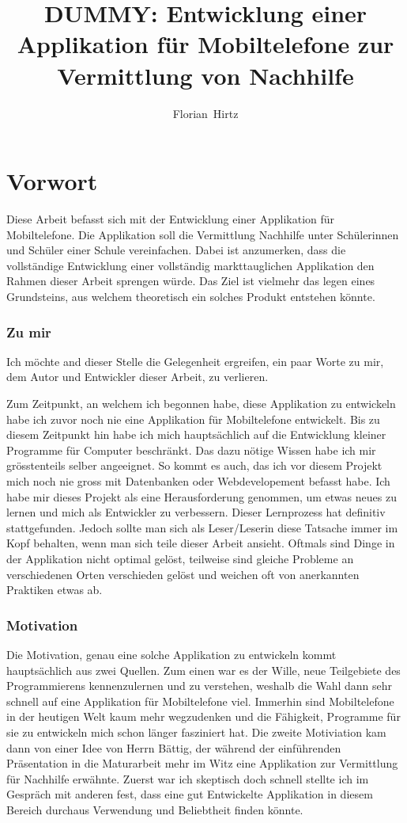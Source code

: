 \documentclass[a4paper,11pt]{report}
\author{Florian~Hirtz}
\title{DUMMY: Entwicklung einer Applikation für Mobiltelefone zur Vermittlung von Nachhilfe}
\begin{document}
	\maketitle	
	\section*{Vorwort}
	Diese Arbeit befasst sich mit der Entwicklung einer Applikation für Mobiltelefone. Die Applikation soll die Vermittlung Nachhilfe unter Schülerinnen und Schüler einer Schule vereinfachen. Dabei ist anzumerken, dass die vollständige Entwicklung einer vollständig markttauglichen Applikation den Rahmen dieser Arbeit sprengen würde. Das Ziel ist vielmehr das legen eines Grundsteins, aus welchem theoretisch ein solches Produkt entstehen könnte.
	\subsubsection*{Zu mir}
	Ich möchte and dieser Stelle die Gelegenheit ergreifen, ein paar Worte zu mir, dem Autor und Entwickler dieser Arbeit, zu verlieren.
	
	Zum Zeitpunkt, an welchem ich begonnen habe, diese Applikation zu entwickeln habe ich zuvor noch nie eine Applikation für Mobiltelefone entwickelt. Bis zu diesem Zeitpunkt hin habe ich mich hauptsächlich auf die Entwicklung kleiner Programme für Computer beschränkt. Das dazu nötige Wissen habe ich mir grösstenteils selber angeeignet. So kommt es auch, das ich vor diesem Projekt mich noch nie gross mit Datenbanken oder Webdevelopement befasst habe. Ich habe mir dieses Projekt als eine Herausforderung genommen, um etwas neues zu lernen und mich als Entwickler zu verbessern. Dieser Lernprozess hat definitiv stattgefunden. Jedoch sollte man sich als Leser/Leserin diese Tatsache immer im Kopf behalten, wenn man sich teile dieser Arbeit ansieht. Oftmals sind Dinge in der Applikation nicht optimal gelöst, teilweise sind gleiche Probleme an verschiedenen Orten verschieden gelöst und weichen oft von anerkannten Praktiken etwas ab.
	\subsubsection*{Motivation}
	Die Motivation, genau eine solche Applikation zu entwickeln kommt hauptsächlich aus zwei Quellen. Zum einen war es der Wille, neue Teilgebiete des Programmierens kennenzulernen und zu verstehen, weshalb die Wahl dann sehr schnell auf eine Applikation für Mobiltelefone viel. Immerhin sind Mobiltelefone in der heutigen Welt kaum mehr wegzudenken und die Fähigkeit, Programme für sie zu entwickeln mich schon länger fasziniert hat. Die zweite Motiviation kam dann von einer Idee von Herrn Bättig, der während der einführenden Präsentation in die Maturarbeit mehr im Witz eine Applikation zur Vermittlung für Nachhilfe erwähnte. Zuerst war ich skeptisch doch schnell stellte ich im Gespräch mit anderen fest, dass eine gut Entwickelte Applikation in diesem Bereich durchaus Verwendung und Beliebtheit finden könnte.
\end{document}
